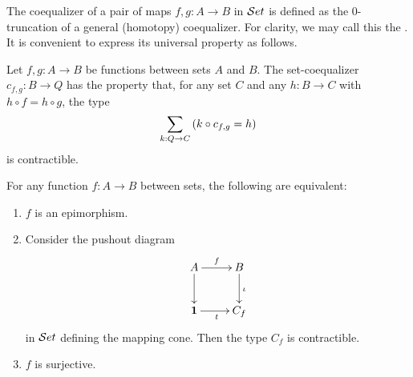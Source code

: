 The coequalizer of a pair of maps $f,g:A\to B$ in $\mathcal{S}et$ is defined as the 0-truncation of a general (homotopy) coequalizer.
For clarity, we may call this the .
%
%
It is convenient to express its universal property as follows.

\begin{lem}
%
Let $f,g:A\to B$ be functions between sets $A$ and $B$. The
{set-co}equalizer $c_{f,g}:B\to Q$ has the property that, for any set $C$ and any $h:B\to C$ with $h\circ f = h\circ g$, the type
\begin{equation*}
\sm{k:Q\to C} (k\circ c_{f,g} = h)
\end{equation*}
is contractible.
\end{lem}

\begin{lem}\label{epis-surj}
For any function $f:A\to B$ between sets, the following are equivalent:
\begin{enumerate}
\item $f$ is an epimorphism.
\item Consider the pushout diagram
\begin{equation*}
  \xymatrix{
    {A}
    \ar[r]^{f}
    \ar[d]
    &
    {B}
    \ar[d]^{\iota}
    \\
    {\unit}
    \ar[r]_{t}
    &
    {C_f}
  }
\end{equation*}
in $\mathcal{S}et$ defining the mapping cone. Then the type $C_f$ is contractible.
\item $f$ is surjective.
\end{enumerate}
\end{lem}

